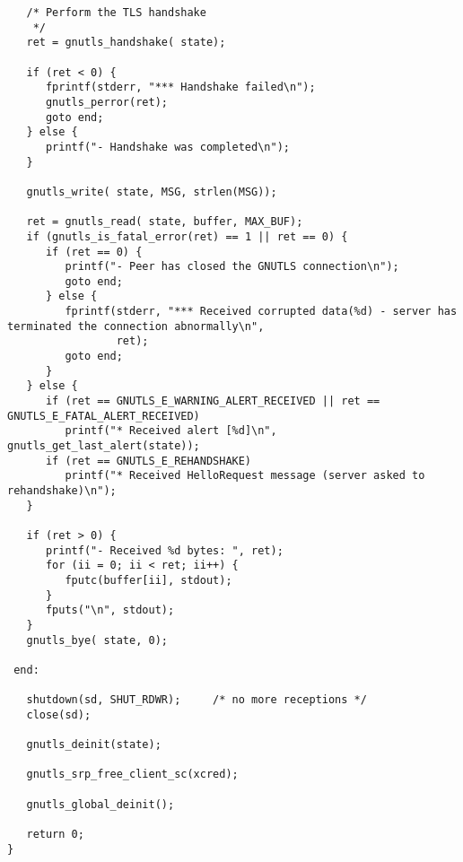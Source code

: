 \begin{verbatim}
   /* Perform the TLS handshake
    */
   ret = gnutls_handshake( state);

   if (ret < 0) {
      fprintf(stderr, "*** Handshake failed\n");
      gnutls_perror(ret);
      goto end;
   } else {
      printf("- Handshake was completed\n");
   }

   gnutls_write( state, MSG, strlen(MSG));

   ret = gnutls_read( state, buffer, MAX_BUF);
   if (gnutls_is_fatal_error(ret) == 1 || ret == 0) {
      if (ret == 0) {
         printf("- Peer has closed the GNUTLS connection\n");
         goto end;
      } else {
         fprintf(stderr, "*** Received corrupted data(%d) - server has terminated the connection abnormally\n",
                 ret);
         goto end;
      }
   } else {
      if (ret == GNUTLS_E_WARNING_ALERT_RECEIVED || ret == GNUTLS_E_FATAL_ALERT_RECEIVED)
         printf("* Received alert [%d]\n", gnutls_get_last_alert(state));
      if (ret == GNUTLS_E_REHANDSHAKE)
         printf("* Received HelloRequest message (server asked to rehandshake)\n");
   }

   if (ret > 0) {
      printf("- Received %d bytes: ", ret);
      for (ii = 0; ii < ret; ii++) {
         fputc(buffer[ii], stdout);
      }
      fputs("\n", stdout);
   }
   gnutls_bye( state, 0);

 end:

   shutdown(sd, SHUT_RDWR);     /* no more receptions */
   close(sd);

   gnutls_deinit(state);

   gnutls_srp_free_client_sc(xcred);

   gnutls_global_deinit();

   return 0;
}

\end{verbatim}
